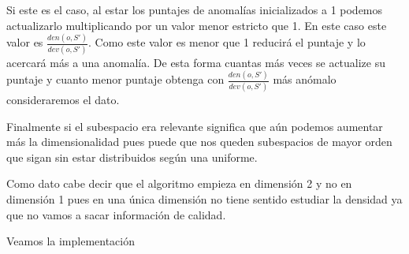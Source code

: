 Si este es el caso, al estar los puntajes de anomalías inicializados a 1 podemos actualizarlo multiplicando por un valor menor estricto que 1. En este caso este valor es $\frac{den(o,S')}{dev(o,S')}$. Como este valor es menor que 1 reducirá el puntaje y lo acercará más a una anomalía. De esta forma cuantas más veces se actualize su puntaje y cuanto menor puntaje obtenga con $\frac{den(o,S')}{dev(o,S')}$ más anómalo consideraremos el dato.

Finalmente si el subespacio era relevante significa que aún podemos aumentar más la dimensionalidad pues puede que nos queden subespacios de mayor orden que sigan sin estar distribuidos según una uniforme.

Como dato cabe decir que el algoritmo empieza en dimensión 2 y no en dimensión 1 pues en una única dimensión no tiene sentido estudiar la densidad ya que no vamos a sacar información de calidad.

Veamos la implementación

